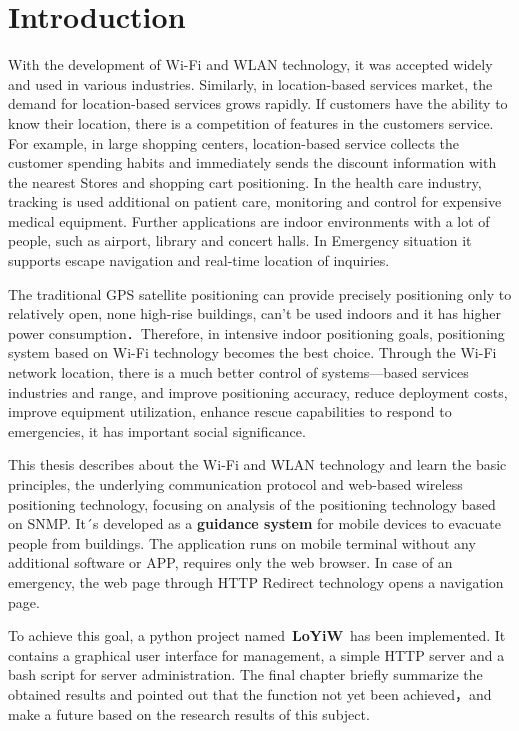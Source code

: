 \newpage
\chapter{Introduction}

With the development of Wi-Fi and WLAN technology, it was accepted widely and used in various industries. Similarly, in location-based services market, the demand for location-based services grows rapidly. If customers have the ability to know their location, there is a competition of features in the customers service. For example, in large shopping centers, location-based service collects the customer spending habits and immediately sends the discount information with the nearest Stores and shopping cart positioning. In the health care industry, tracking is used additional on patient care, monitoring and control for expensive medical equipment. Further applications are indoor environments with a lot of people, such as airport, library and concert halls. In Emergency situation it supports escape navigation and real-time location of inquiries.

The traditional GPS satellite positioning can provide precisely positioning only to relatively open, none high-rise buildings, can’t be used indoors and it has higher power consumption．Therefore, in intensive indoor positioning goals, positioning system based on Wi-Fi technology becomes the best choice. Through the Wi-Fi network location, there is a much better control of systems—based services industries and range, and improve positioning accuracy, reduce deployment costs, improve equipment utilization, enhance rescue capabilities to respond to emergencies, it has important social significance.

This thesis describes about the Wi-Fi and WLAN technology and learn the basic principles, the underlying communication protocol and web-based wireless positioning technology, focusing on analysis of the positioning technology based on SNMP. It´s developed as a \textbf{guidance system} for mobile devices to evacuate people from buildings. The application runs on mobile terminal without any additional software or APP, requires only the web browser. In case of an emergency, the web page through HTTP Redirect technology opens a navigation page.

To achieve this goal, a python project named \textbf{LoYiW} has been implemented. It contains a graphical user interface for management, a simple HTTP server and a bash script for server administration. The final chapter briefly summarize the obtained results and pointed out that the function not yet been achieved，and make a future based on the research results of this subject.